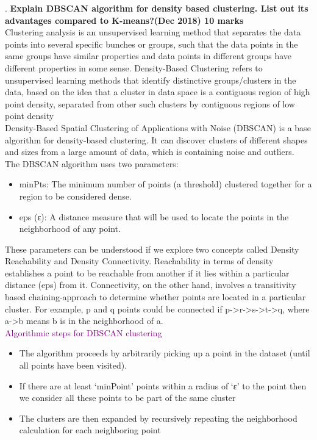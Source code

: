.
\textbf{\textcolor{LightMagenta}{Explain DBSCAN algorithm for density based clustering. List out its
advantages compared to K-means?(Dec 2018) \hfill 10 marks}} \\[5pt]
Clustering analysis is an unsupervised learning method that separates the data points
into several specific bunches or groups, such that the data points in the same groups
have similar properties and data points in different groups have different properties in
some sense.
Density-Based Clustering refers to unsupervised learning methods that identify
distinctive groups/clusters in the data, based on the idea that a cluster in data space is a
contiguous region of high point density, separated from other such clusters by
contiguous regions of low point density\\
Density-Based Spatial Clustering of Applications with Noise (DBSCAN) is a base
algorithm for density-based clustering. It can discover clusters of different shapes and
sizes from a large amount of data, which is containing noise and outliers.\\
The DBSCAN algorithm uses two parameters:



\begin{itemize}
    \item  minPts: The minimum number of points (a threshold) clustered together for a
region to be considered dense.
    \item eps (ε): A distance measure that will be used to locate the points in the
neighborhood of any point.
\end{itemize}

These parameters can be understood if we explore two concepts called Density
Reachability and Density Connectivity.
Reachability in terms of density establishes a point to be reachable from another if it lies
within a particular distance (eps) from it.
Connectivity, on the other hand, involves a transitivity based chaining-approach to
determine whether points are located in a particular cluster. For example, p and q points
could be connected if p->r->s->t->q, where a->b means b is in the neighborhood of a. \\

\textcolor{purple}{Algorithmic steps for DBSCAN clustering}

\begin{itemize}
    \item  The algorithm proceeds by arbitrarily picking up a point in the dataset (until all
points have been visited).
    \item If there are at least ‘minPoint’ points within a radius of ‘ε’ to the point then we
consider all these points to be part of the same cluster
    \item The clusters are then expanded by recursively repeating the neighborhood
calculation for each neighboring point
\end{itemize}

